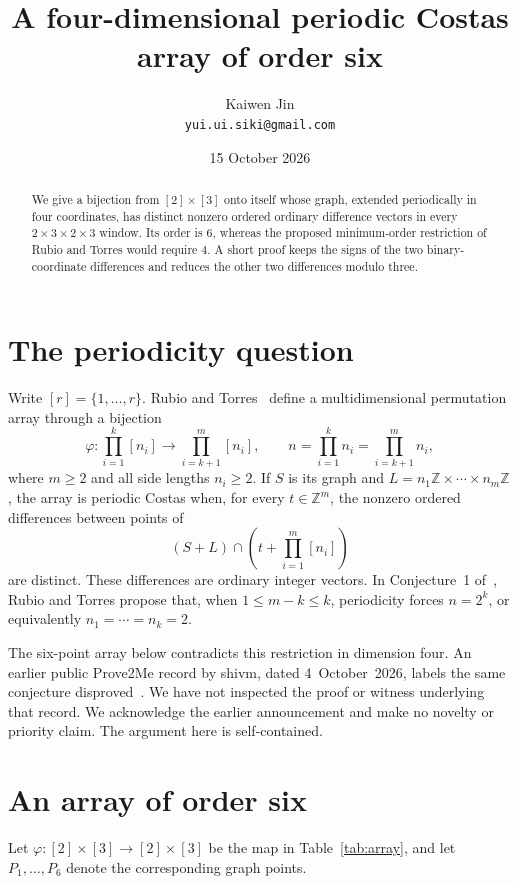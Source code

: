 \documentclass[11pt,a4paper]{article}
\title{A four-dimensional periodic Costas array of order six}
\author{Kaiwen Jin\\\small\texttt{yui.ui.siki@gmail.com}}
\date{15 October 2026}
\newcommand{\Z}{\mathbb Z}
\begin{document}
\maketitle
\begin{abstract}
We give a bijection from $[2]\times[3]$ onto itself whose graph, extended
periodically in four coordinates, has distinct nonzero ordered ordinary
difference vectors in every $2\times3\times2\times3$ window. Its order is
$6$, whereas the proposed minimum-order restriction of Rubio and Torres
would require $4$. A short proof keeps the signs of the two binary-coordinate
differences and reduces the other two differences modulo three.
\end{abstract}

\section{The periodicity question}

Write $[r]=\{1,\ldots,r\}$. Rubio and Torres~\cite{RT} define a
multidimensional permutation array through a bijection
\[
 \varphi:\prod_{i=1}^k[n_i]\longrightarrow\prod_{i=k+1}^m[n_i],
 \qquad n=\prod_{i=1}^k n_i=\prod_{i=k+1}^m n_i,
\]
where $m\geq2$ and all side lengths $n_i\geq2$. If $S$ is its graph and
$L=n_1\Z\times\cdots\times n_m\Z$, the array is periodic Costas when,
for every $t\in\Z^m$, the nonzero ordered differences between points of
\[
 (S+L)\cap\left(t+\prod_{i=1}^m[n_i]\right)
\]
are distinct. These differences are ordinary integer vectors. In
Conjecture~1 of~\cite{RT}, Rubio and Torres propose that, when
$1\leq m-k\leq k$, periodicity forces $n=2^k$, or equivalently
$n_1=\cdots=n_k=2$.

The six-point array below contradicts this restriction in dimension four.
An earlier public Prove2Me record by shivm, dated 4~October~2026, labels
the same conjecture disproved~\cite{prior}. We have not inspected the proof
or witness underlying that record. We acknowledge the earlier announcement
and make no novelty or priority claim. The argument here is self-contained.

\clearpage
\section{An array of order six}

Let $\varphi:[2]\times[3]\to[2]\times[3]$ be the map in Table~\ref{tab:array},
and let $P_1,\ldots,P_6$ denote the corresponding graph points.
\end{document}
